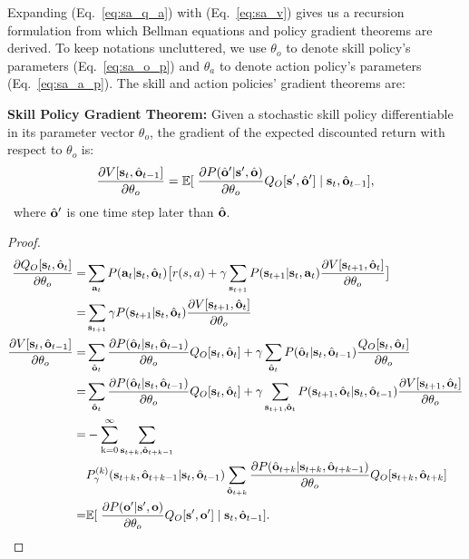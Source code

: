 Expanding (Eq.~\ref{eq:sa_q_a}) with (Eq.~\ref{eq:sa_v}) gives us
a recursion formulation from which Bellman equations and policy
gradient theorems are derived. To keep notations uncluttered, we
use $\theta_o$ to denote skill policy's parameters
(Eq.~\ref{eq:sa_o_p}) and $\theta_a$ to denote action policy's
parameters (Eq.~\ref{eq:sa_a_p}). The skill and action policies'
gradient theorems are:
\begin{thm}
  \textbf{ Skill Policy Gradient Theorem: } Given a stochastic skill policy
  differentiable in its parameter vector $\theta_o$, the gradient
  of the expected discounted return with respect to $\theta_o$ is:
  \begin{equation}
    \label{eq:sa_o_grad}
    \frac{\partial V[{\mathbf{s}}_t,\hat{{\mathbf{o}}}_{t-1}]}{\partial \theta_o}=\mathbb{E}[\;\frac{\partial P(\hat{{\mathbf{o}}}'|{\mathbf{s}}',\hat{{\mathbf{o}}})}{\partial \theta_o}Q_O[{\mathbf{s}}',\hat{{\mathbf{o}}}']\;|\;{\mathbf{s}}_t,\hat{{\mathbf{o}}}_{t-1}],
  \end{equation}
  ~where $\hat{{\mathbf{o}}}'$ is one time step later than $\hat{{\mathbf{o}}}$.

  \begin{proof}
    \begin{align*}
      \frac{\partial Q_O[{\mathbf{s}}_t,\hat{{\mathbf{o}}}_t]}{ \partial \theta_o }=& \sum_{{\mathbf{a}}_t}P({\mathbf{a}}_t|{\mathbf{s}}_t,\hat{{\mathbf{o}}}_t)\big[r(s,a) + \gamma\sum_{{\mathbf{s}}_{t+1}}P({\mathbf{s}}_{t+1}|{\mathbf{s}}_t,{\mathbf{a}}_t)\frac{\partial V[{\mathbf{s}}_{t+1},\hat{{\mathbf{o}}}_t]}{\partial \theta_o}\big]\\
      =&\sum_{{\mathbf{s}}_{t+1}}\gamma P({\mathbf{s}}_{t+1}|{\mathbf{s}}_t,\hat{{\mathbf{o}}}_t)\frac{\partial V[{\mathbf{s}}_{t+1},\hat{{\mathbf{o}}}_t]}{\partial \theta_o}\\
      \frac{\partial V[{\mathbf{s}}_t,\hat{{\mathbf{o}}}_{t-1}]}{\partial \theta_o}=&\sum_{\hat{{\mathbf{o}}}_t}\frac{\partial P(\hat{{\mathbf{o}}}_t|{\mathbf{s}}_t,\hat{{\mathbf{o}}}_{t-1})}{\partial \theta_o}Q_O[{\mathbf{s}}_t,\hat{{\mathbf{o}}}_t]+\gamma\sum_{\hat{{\mathbf{o}}}_t}P(\hat{{\mathbf{o}}}_t|{\mathbf{s}}_t,\hat{{\mathbf{o}}}_{t-1})\frac{Q_O[{\mathbf{s}}_t,\hat{{\mathbf{o}}}_t]}{\partial \theta_o}\\
      =&\sum_{\hat{{\mathbf{o}}}_t}\frac{\partial P(\hat{{\mathbf{o}}}_t|{\mathbf{s}}_t,\hat{{\mathbf{o}}}_{t-1})}{\partial \theta_o}Q_O[{\mathbf{s}}_t,\hat{{\mathbf{o}}}_t]
         +\gamma\sum_{{\mathbf{s}}_{t+1},\hat{{\mathbf{o}}}_t}P({\mathbf{s}}_{t+1},\hat{{\mathbf{o}}}_t|{\mathbf{s}}_t,\hat{{\mathbf{o}}}_{t-1})\frac{\partial V[{\mathbf{s}}_{t+1},\hat{{\mathbf{o}}}_t]}{\partial \theta_o}\\
      =&-\sum_{{\textnormal{k}}=0}^\infty\sum_{{\mathbf{s}}_{t+k},\hat{{\mathbf{o}}}_{t+k-1}}\\
                                                              &P_{\gamma}^{(k)}({\mathbf{s}}_{t+k},\hat{{\mathbf{o}}}_{t+k-1}|{\mathbf{s}}_{t},\hat{{\mathbf{o}}}_{t-1})\sum_{\hat{{\mathbf{o}}}_{t+k}}\frac{\partial P(\hat{{\mathbf{o}}}_{t+k}|{\mathbf{s}}_{t+k},\hat{{\mathbf{o}}}_{t+k-1})}{\partial \theta_o}Q_O[ {\mathbf{s}}_{t+k},\hat{{\mathbf{o}}}_{t+k}]\\
      =&\mathbb{E}[\;\frac{\partial P({\mathbf{o}}'|{\mathbf{s}}',{\mathbf{o}})}{\partial \theta_o}Q_O[{\mathbf{s}}',{\mathbf{o}}']\;|\;{\mathbf{s}}_t,\hat{{\mathbf{o}}}_{t-1}].
  \end{align*}
\end{proof}
\end{thm}


